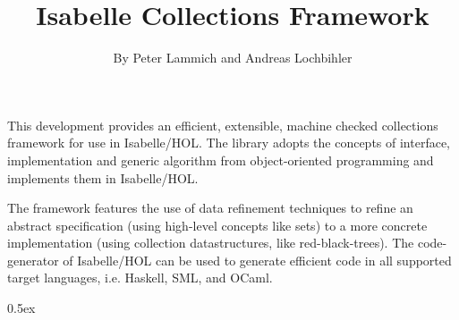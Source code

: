 \documentclass[11pt,a4paper]{book}
\makeatletter
\newenvironment{abstract}{%
  \small
  \begin{center}%
    {\bfseries \abstractname\vspace{-.5em}\vspace{\z@}}%
  \end{center}%
  \quotation}{\endquotation}
\makeatother
\begin{document}
\title{Isabelle Collections Framework}
\author{By Peter Lammich and Andreas Lochbihler}
\maketitle

\begin{abstract}
  This development provides an efficient, extensible, machine checked collections framework for use
  in Isabelle/HOL. The library adopts the concepts of interface, implementation and generic algorithm from
  object-oriented programming and implements them in Isabelle/HOL.

  The framework features the use of data refinement techniques to refine an abstract specification (using high-level concepts like sets) to a more concrete implementation (using collection datastructures, like red-black-trees). The code-generator of Isabelle/HOL can be used to generate efficient code in all supported target languages, i.e. Haskell, SML, and OCaml.
\end{abstract}

\clearpage

\tableofcontents

\clearpage

\parindent 0pt\parskip 0.5ex








\end{document}
